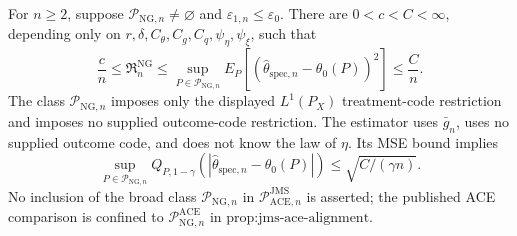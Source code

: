 For \(n\ge2\), suppose \(\mathcal P_{\mathrm{NG},n}\neq\varnothing\) and \(\varepsilon_{1,n}\le\varepsilon_0\). There are \(0<c<C<\infty\), depending only on \(r,\delta,C_{\theta},C_g,C_q,\psi_{\eta},\psi_{\xi}\), such that
\[
 \frac{c}{n}
 \le \mathfrak R_n^{\mathrm{NG}}
 \le \sup_{P\in\mathcal P_{\mathrm{NG},n}}
 E_P[(\widehat\theta_{\mathrm{spec},n}-\theta_0(P))^2]
 \le \frac{C}{n}.
\]
The class \(\mathcal P_{\mathrm{NG},n}\) imposes only the displayed \(L^1(P_X)\) treatment-code restriction and imposes no supplied outcome-code restriction. The estimator uses \(\bar g_n\), uses no supplied outcome code, and does not know the law of \(\eta\). Its MSE bound implies
\[
 \sup_{P\in\mathcal P_{\mathrm{NG},n}}
 Q_{P,1-\gamma}(|\widehat\theta_{\mathrm{spec},n}-\theta_0(P)|)
 \le \sqrt{C/(\gamma n)}.
\]
No inclusion of the broad class \(\mathcal P_{\mathrm{NG},n}\) in \(\mathcal P_{\mathrm{ACE},n}^{\mathrm{JMS}}\) is asserted; the published ACE comparison is confined to \(\mathcal P_{\mathrm{NG},n}^{\mathrm{ACE}}\) in \(\text{prop:jms-ace-alignment}\).